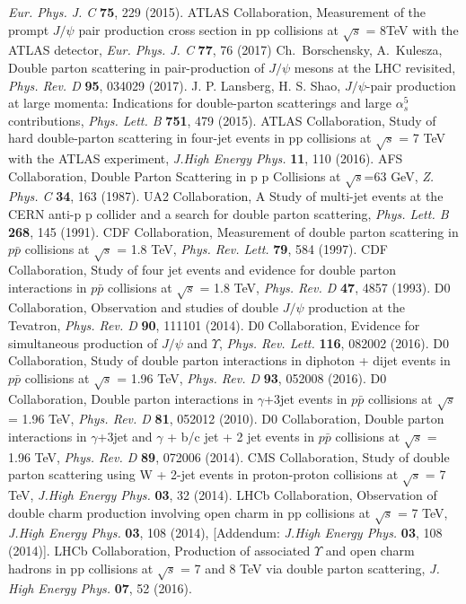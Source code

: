 \documentclass{ws-rv9x6}
\begin{document}
\begin{thebibliography}{99}
    \emph{Eur. Phys. J. C} {\bf 75}, 229 (2015).
   ATLAS Collaboration, Measurement of the prompt $J/\psi$ pair production cross section in pp collisions at $\sqrt{s}$ = 8TeV with the ATLAS detector, \emph{Eur. Phys. J. C} {\bf 77}, 76 (2017) 
 Ch.~Borschensky, A.~Kulesza, Double parton scattering in pair-production of $J/\psi$ mesons at the LHC revisited, \emph{Phys. Rev. D} {\bf 95},  034029 (2017).
J. P. Lansberg, H. S. Shao, $J/\psi$-pair production at large momenta: Indications for double-parton scatterings and large $\alpha^5_s$ contributions, \emph{Phys. Lett. B} {\bf 751}, 479 (2015).
 ATLAS Collaboration, Study of hard double-parton scattering in four-jet events in pp collisions at $\sqrt{s}$ = 7 TeV with the ATLAS experiment,
 \emph{J.High Energy Phys.} {\bf 11}, 110 (2016). 
AFS Collaboration,
Double Parton Scattering in p p Collisions at $\sqrt{s}$=63 GeV, 
\emph{Z. Phys. C} {\bf 34}, 163 (1987).
UA2 Collaboration,
A Study of multi-jet events at the CERN anti-p p collider and a search for double parton scattering, \emph{Phys. Lett. B} {\bf 268}, 145 (1991).
CDF Collaboration, Measurement of double parton scattering in $p\bar{p}$ collisions at $\sqrt{s}$ = 1.8 TeV, \emph{Phys. Rev. Lett.} {\bf 79}, 584 (1997).
 CDF Collaboration, Study of four jet events and evidence for double parton interactions in $p\bar{p}$ collisions at $\sqrt{s}$ = 1.8 TeV, \emph{Phys. Rev. D} {\bf 47}, 4857 (1993).
D0 Collaboration, Observation and studies of double $J/\psi$ production at the Tevatron, \emph{Phys. Rev. D} {\bf 90}, 111101 (2014).
D0 Collaboration, Evidence for simultaneous production of $J/\psi$ and $\Upsilon$, \emph{ Phys. Rev. Lett.} {\bf 116}, 082002 (2016).
D0 Collaboration,
Study of double parton interactions in diphoton + dijet events in $p\bar{p}$ collisions at $\sqrt{s}$ = 1.96 TeV, \emph{Phys. Rev. D} {\bf 93}, 052008 (2016).
D0 Collaboration, Double parton interactions in $\gamma$+3jet events in $p\bar{p}$ collisions at $\sqrt{s}$ = 1.96 TeV, \emph{Phys. Rev. D} {\bf 81}, 052012 (2010).  
D0 Collaboration, Double parton interactions in $\gamma$+3jet and $\gamma$ + b/c jet + 2 jet events in $p\bar{p}$ collisions at $\sqrt{s}$ = 1.96 TeV, \emph{Phys. Rev. D} {\bf 89}, 072006 (2014).
CMS Collaboration, Study of double parton scattering using W + 2-jet events in proton-proton collisions at $\sqrt{s}$ = 7 TeV, \emph{J.High Energy Phys.} {\bf 03}, 32 (2014).
LHCb Collaboration, Observation of double charm production involving open charm in pp collisions at $\sqrt{s}$ = 7 TeV, \emph{J.High Energy Phys.} {\bf 03}, 108 (2014), [Addendum: \emph{J.High Energy Phys.} {\bf 03}, 108 (2014)].
LHCb Collaboration, Production of associated $\Upsilon$ and open charm hadrons in pp collisions at $\sqrt{s}$ = 7 and 8 TeV via double parton scattering, \emph{J. High Energy Phys.} {\bf 07}, 52 (2016).  
\end{thebibliography}
\end{document}
